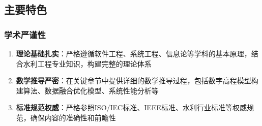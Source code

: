 \subsection{主要特色}\label{ux4e3bux8981ux7279ux8272} \subsubsection{学术严谨性}\label{ux5b66ux672fux4e25ux8c28ux6027}
\begin{enumerate} \def\labelenumi{\arabic{enumi}.} \tightlist \item
\textbf{理论基础扎实}：严格遵循软件工程、系统工程、信息论等学科的基本原理，结合水利工程专业知识，构建完整的理论体系 \item
\textbf{数学推导严密}：在关键章节中提供详细的数学推导过程，包括数字高程模型构建算法、数据融合优化模型、系统性能分析等 \item
\textbf{标准规范权威}：严格参照ISO/IEC标准、IEEE标准、水利行业标准等权威规范，确保内容的准确性和前瞻性 \end{enumerate}
